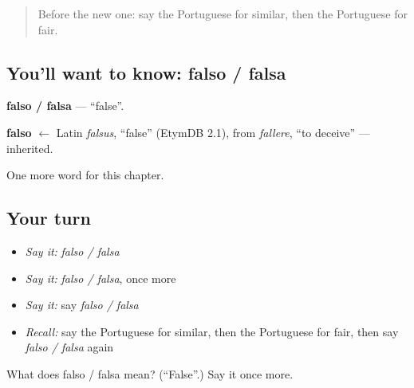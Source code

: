 \label{lesson:PT-C186-falso-falsa}



\begin{quote}
Before the new one: say the Portuguese for similar, then the Portuguese for fair.
\end{quote}

\subsection*{You'll want to know: falso / falsa}
\textbf{falso / falsa} — \textquotedblleft{}false\textquotedblright{}.

\begin{cousinweb}
\textbf{falso} $\leftarrow$ Latin \emph{falsus}, \textquotedblleft{}false\textquotedblright{} (EtymDB 2.1), from \emph{fallere}, \textquotedblleft{}to deceive\textquotedblright{} — inherited.
\end{cousinweb}

\begin{grammarlens}[title={What you've built}]
One more word for this chapter.
\end{grammarlens}

\subsection*{Your turn}
\begin{itemize}
\raggedright
  \item \emph{Say it:} \emph{falso / falsa}
  \item \emph{Say it:} \emph{falso / falsa}, once more
  \item \emph{Say it:} say \emph{falso / falsa}
  \item \emph{Recall:} say the Portuguese for similar, then the Portuguese for fair, then say \emph{falso / falsa} again
\end{itemize}

\begin{tcolorbox}[breakable,colback=teal!4,colframe=teal!35!black,title={Before you move on}]
What does falso / falsa mean? (\textquotedblleft{}False\textquotedblright{}.) Say it once more.
\end{tcolorbox}
